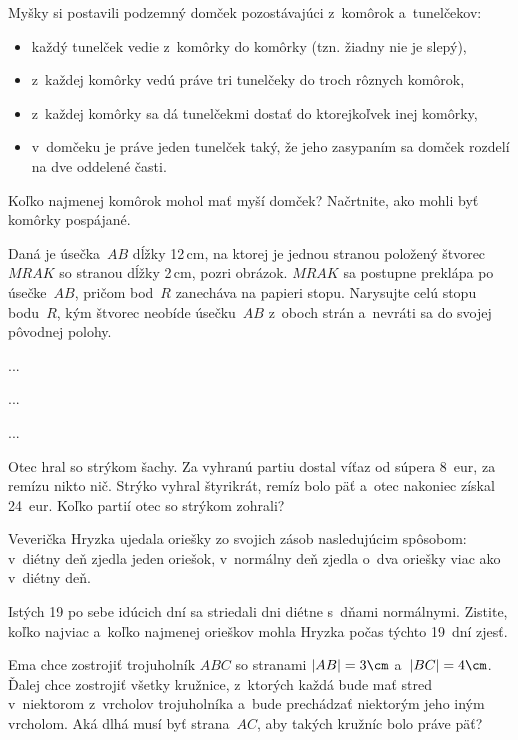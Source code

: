 {%
Myšky si postavili podzemný domček pozostávajúci z~komôrok a~tunelčekov:
\begin{itemize}
\item každý tunelček vedie z~komôrky do komôrky (tzn. žiadny nie je slepý),
\item z~každej komôrky vedú práve tri tunelčeky do troch rôznych komôrok,
\item z~každej komôrky sa dá tunelčekmi dostať do ktorejkoľvek inej komôrky,
\item v~domčeku je práve jeden tunelček taký, že jeho zasypaním sa domček rozdelí na dve oddelené časti.
\end{itemize}
Koľko najmenej komôrok mohol mať myší domček?
Načrtnite, ako mohli byť komôrky pospájané.
}

{%
Daná je úsečka~$AB$ dĺžky 12\,cm, na ktorej je jednou stranou položený štvorec $MRAK$ so stranou dĺžky 2\,cm, pozri obrázok.
$MRAK$ sa postupne preklápa po úsečke~$AB$, pričom bod~$R$ zanecháva na papieri stopu.
Narysujte celú stopu bodu~$R$, kým
štvorec neobíde úsečku~$AB$ z~oboch strán a~nevráti sa do svojej pôvodnej polohy.
%
}

{%
...}

{%
...}

{%
...}

{%
Otec hral so strýkom šachy.
Za vyhranú partiu dostal víťaz od súpera 8~eur, za remízu nikto nič.
Strýko vyhral štyrikrát, remíz bolo päť a~otec nakoniec získal 24~eur.
Koľko partií otec so strýkom zohrali?}

{%
Veverička Hryzka ujedala oriešky zo svojich zásob nasledujúcim spôsobom:
\itemitem{$\bullet$} v~diétny deň zjedla jeden oriešok,
\itemitem{$\bullet$} v~normálny deň zjedla o~dva oriešky viac ako v~diétny deň.

Istých 19 po sebe idúcich dní sa striedali dni diétne s~dňami normálnymi.
Zistite, koľko najviac a~koľko najmenej orieškov mohla Hryzka počas týchto 19~dní zjesť.}

{%
Ema chce zostrojiť trojuholník $ABC$ so stranami $|AB|=3\cm$ a~$|BC|=4\cm$.
Ďalej chce zostrojiť všetky kružnice, z~ktorých každá bude mať stred v~niektorom z~vrcholov trojuholníka a~bude prechádzať niektorým jeho iným vrcholom.
Aká dlhá musí byť strana~$AC$, aby takých kružníc bolo práve päť?}


